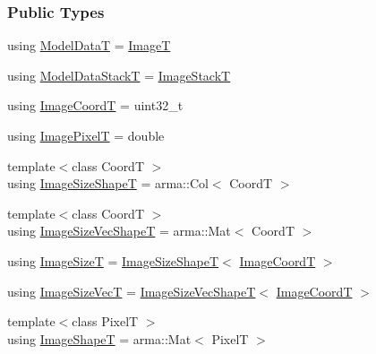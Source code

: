 \subsubsection*{Public Types}
\begin{DoxyCompactItemize}
\item 
using \hyperlink{classmappel_1_1PoissonNoise2DObjective_afe2da04c65d68529e79e41002d4f7827}{Model\+DataT} = \hyperlink{classmappel_1_1ImageFormat2DBase_a667ea5016648958e507e7db8eaa041b0}{ImageT}
\item 
using \hyperlink{classmappel_1_1PoissonNoise2DObjective_a889b543eb0ba9494f749a4d1b17b59b4}{Model\+Data\+StackT} = \hyperlink{classmappel_1_1ImageFormat2DBase_a8f0276e94ff242fa4740a718642f5e14}{Image\+StackT}
\item 
using \hyperlink{classmappel_1_1ImageFormat2DBase_a45e9234d63c357f34ca56c72c12b9e9c}{Image\+CoordT} = uint32\+\_\+t
\item 
using \hyperlink{classmappel_1_1ImageFormat2DBase_af6bae6f78398ab1eacb39726a05adeef}{Image\+PixelT} = double
\item 
{\footnotesize template$<$class CoordT $>$ }\\using \hyperlink{classmappel_1_1ImageFormat2DBase_a23c1a9e9f1482852aa0cf4951efe7c48}{Image\+Size\+ShapeT} = arma\+::\+Col$<$ CoordT $>$
\item 
{\footnotesize template$<$class CoordT $>$ }\\using \hyperlink{classmappel_1_1ImageFormat2DBase_afe9ededf04942330121003e3dd8f9311}{Image\+Size\+Vec\+ShapeT} = arma\+::\+Mat$<$ CoordT $>$
\item 
using \hyperlink{classmappel_1_1ImageFormat2DBase_a49cccf61eb2a768a202634d27fcd81d5}{Image\+SizeT} = \hyperlink{classmappel_1_1ImageFormat2DBase_a23c1a9e9f1482852aa0cf4951efe7c48}{Image\+Size\+ShapeT}$<$ \hyperlink{classmappel_1_1ImageFormat2DBase_a45e9234d63c357f34ca56c72c12b9e9c}{Image\+CoordT} $>$
\item 
using \hyperlink{classmappel_1_1ImageFormat2DBase_aa88536c52195a927cf32558856f05a13}{Image\+Size\+VecT} = \hyperlink{classmappel_1_1ImageFormat2DBase_afe9ededf04942330121003e3dd8f9311}{Image\+Size\+Vec\+ShapeT}$<$ \hyperlink{classmappel_1_1ImageFormat2DBase_a45e9234d63c357f34ca56c72c12b9e9c}{Image\+CoordT} $>$
\item 
{\footnotesize template$<$class PixelT $>$ }\\using \hyperlink{classmappel_1_1ImageFormat2DBase_ac40fc3773b5668601c63905876cca732}{Image\+ShapeT} = arma\+::\+Mat$<$ PixelT $>$
\item 

\end{DoxyCompactItemize}
